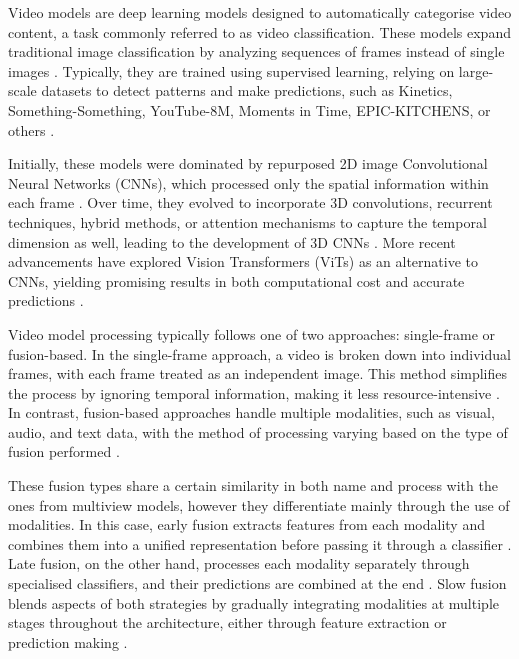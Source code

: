 Video models are deep learning models designed to automatically categorise video content, a task commonly referred to as video classification. These models expand traditional image classification by analyzing sequences of frames instead of single images \cite{electronics13142732}. Typically, they are trained using supervised learning, relying on large-scale datasets to detect patterns and make predictions, such as Kinetics, Something-Something, YouTube-8M, Moments in Time, EPIC-KITCHENS, or others  \cite{electronics13142732}.

Initially, these models were dominated by repurposed 2D image Convolutional Neural Networks (CNNs), which processed only the spatial information within each frame \cite{electronics13142732, DBLP:journals/corr/abs-2103-15691}. Over time, they evolved to incorporate 3D convolutions, recurrent techniques, hybrid methods, or attention mechanisms to capture the temporal dimension as well, leading to the development of 3D CNNs \cite{electronics13142732}. More recent advancements have explored Vision Transformers (ViTs) as an alternative to CNNs, yielding promising results in both computational cost and accurate predictions \cite{electronics13142732, DBLP:journals/corr/abs-2103-15691, DBLP:journals/corr/abs-2102-05095}.

Video model processing typically follows one of two approaches: single-frame or fusion-based. In the single-frame approach, a video is broken down into individual frames, with each frame treated as an independent image. This method simplifies the process by ignoring temporal information, making it less resource-intensive \cite{electronics13142732}. In contrast, fusion-based approaches handle multiple modalities, such as visual, audio, and text data, with the method of processing varying based on the type of fusion performed \cite{electronics13142732}.

These fusion types share a certain similarity in both name and process with the ones from multiview models, however they differentiate mainly through the use of modalities. In this case, early fusion extracts features from each modality and combines them into a unified representation before passing it through a classifier \cite{electronics13142732}. Late fusion, on the other hand, processes each modality separately through specialised classifiers, and their predictions are combined at the end \cite{electronics13142732}. Slow fusion blends aspects of both strategies by gradually integrating modalities at multiple stages throughout the architecture, either through feature extraction or prediction making \cite{electronics13142732}.